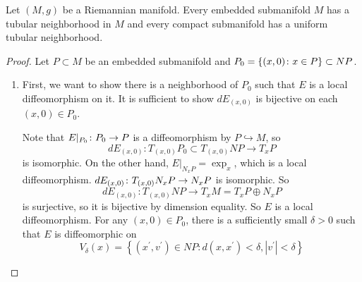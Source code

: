 \begin{enumerate}[label=\arabic{*}.]
	\begin{thm}
	    Let $(M,g)$ be a Riemannian manifold. Every embedded submanifold $M$ has a tubular neighborhood in $M$ and every compact submanifold has a uniform tubular neighborhood.
	\end{thm}
	\begin{proof}
		Let $P \subset M$ be an embedded submanifold and $P_0 = \left\{(x,0) \colon x\in P\right\} \subset NP$. 
		\begin{enumerate}[label=(\roman*)]
			\item First, we want to show there is a neighborhood of $P_0$ such that $E$ is a local diffeomorphism on it. It is sufficient to show $dE_{(x,0)}$ is bijective on each $(x,0) \in P_0$.

		    \noindent Note that $E|_{P_0} \colon P_0 \rightarrow P$ is a diffeomorphism by $P \hookrightarrow M$, so
		    \begin{equation*}
		        dE_{(x,0)} \colon T_{(x,0)}P_0 \subset T_{(x,0)}NP \longrightarrow T_xP
		    \end{equation*}
		    is isomorphic. On the other hand, $E|_{N_xP} = \exp_x$, which is a local  diffeomorphism. $dE_{(x,0)} \colon T_{(x,0)}N_xP \rightarrow N_xP$ is isomorphic. So
		    \begin{equation*}
		        dE_{(x,0)} \colon T_{(x,0)}NP \longrightarrow T_xM = T_xP \oplus N_xP
		    \end{equation*}
		    is surjective, so it is bijective by dimension equality. So $E$ is a local diffeomorphism. For any $(x,0) \in P_0$, there is a sufficiently small $\delta>0$ such that $E$ is diffeomorphic on
		    \begin{equation*}
		        V_\delta(x)=\left\{\left(x^{\prime}, v^{\prime}\right) \in N P: d\left(x, x^{\prime}\right)<\delta,\left|v^{\prime}\right|<\delta\right\}
		    \end{equation*}


\end{enumerate}
\end{proof}
\end{enumerate}
